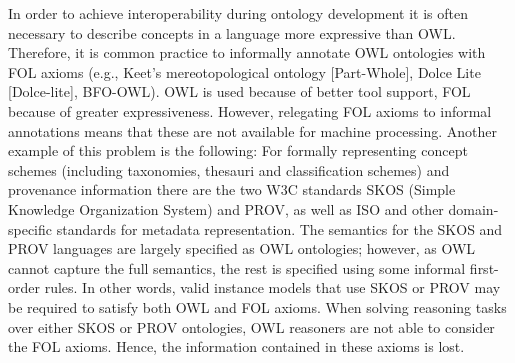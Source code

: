 \documentclass[10pt,fleqn,%
\ifpretendfinal
final%
\else
draft%
\fi,
]{scrreprt}
\begin{document}
In order to achieve interoperability during ontology development it is often necessary to describe 
concepts in a language more expressive than OWL.  Therefore, it is common practice to informally 
annotate OWL ontologies with FOL axioms (e.g., Keet's mereotopological ontology [Part-Whole], 
Dolce Lite [Dolce-lite], BFO-OWL). OWL is used because of better tool support, FOL because of 
greater expressiveness. However, relegating FOL axioms to  informal annotations means that these 
are not available for machine processing.  Another example of this problem is the following: For 
formally representing concept schemes (including taxonomies, thesauri and classification schemes) 
and provenance information there are the two W3C standards SKOS (Simple Knowledge Organization 
System) and PROV, as well as ISO and other domain-specific  standards for 
metadata representation. The semantics for the SKOS and PROV languages are largely specified as OWL 
ontologies; however, as OWL cannot capture the full semantics, the rest is specified using some 
informal first-order rules. In other words, valid instance models that use SKOS or PROV may be 
required to satisfy both OWL and FOL axioms. When solving reasoning tasks over either SKOS or PROV 
ontologies, OWL reasoners are not able to consider the  FOL axioms. Hence, the information 
contained in these axioms is lost.
\end{document}

